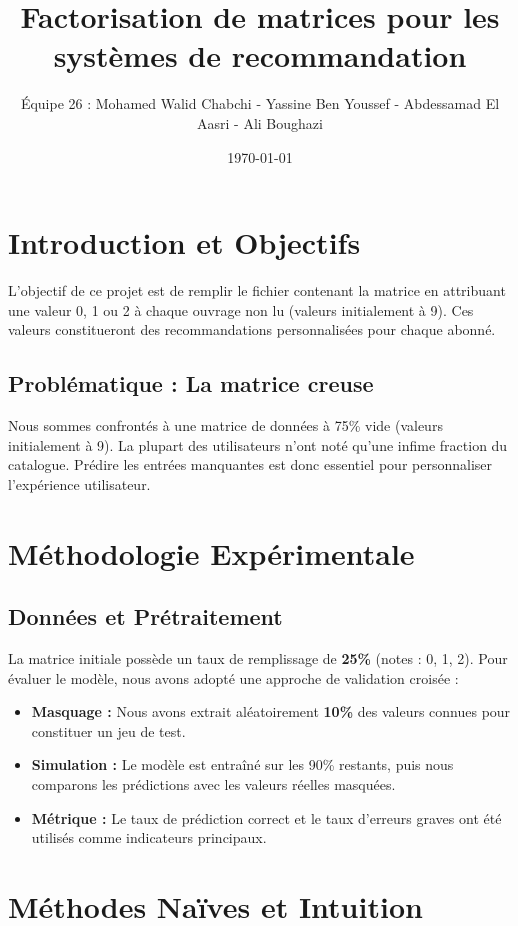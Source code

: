 \documentclass[11pt,a4paper]{article}
\title{Factorisation de matrices pour les systèmes de recommandation}
\author{Équipe 26 : Mohamed Walid Chabchi - Yassine Ben Youssef - Abdessamad El Aasri - Ali Boughazi}
\date{\today}
\begin{document}
\maketitle

\tableofcontents
\newpage

\section{Introduction et Objectifs}

L'objectif de ce projet est de remplir le fichier contenant la matrice en attribuant une valeur 0, 1 ou 2 à chaque ouvrage non lu (valeurs initialement à 9). Ces valeurs constitueront des recommandations personnalisées pour chaque abonné.

\subsection{Problématique : La matrice creuse}
Nous sommes confrontés à une matrice de données à 75\% vide (valeurs initialement à 9). La plupart des utilisateurs n'ont noté qu'une infime fraction du catalogue. Prédire les entrées manquantes est donc essentiel pour personnaliser l'expérience utilisateur.

\section{Méthodologie Expérimentale} 
\subsection{Données et Prétraitement} 
La matrice initiale possède un taux de remplissage de \textbf{25\%} (notes : 0, 1, 2). Pour évaluer le modèle, nous avons adopté une approche de validation croisée : 
\begin{itemize} 
\item \textbf{Masquage :} Nous avons extrait aléatoirement \textbf{10\%} des valeurs connues pour constituer un jeu de test. 
\item \textbf{Simulation :} Le modèle est entraîné sur les 90\% restants, puis nous comparons les prédictions avec les valeurs réelles masquées. 
\item \textbf{Métrique :} Le taux de prédiction correct et le taux d'erreurs graves ont été utilisés comme indicateurs principaux. 
\end{itemize}

\section{Méthodes Naïves et Intuition}
\end{document}
